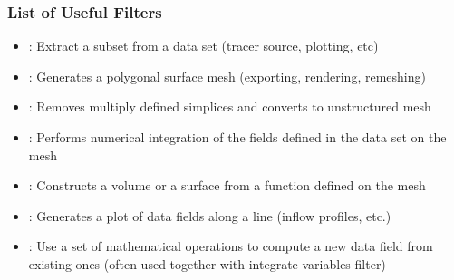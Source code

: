 \begin{frame}

  \frametitle{List of Useful Filters}

    \begin{itemize}
      \item {}: Extract a subset from a data set (tracer source, plotting, etc)
      \item {}: Generates a polygonal surface mesh (exporting, rendering, remeshing) 
      \item {}: Removes multiply defined simplices and converts to unstructured mesh
      \item {}: Performs numerical integration of the fields defined in the data set on the mesh 
      \item {}: Constructs a volume or a surface from a function defined on the mesh 
      \item {}: Generates a plot of data fields along a line (inflow profiles, etc.) 
      \item {}: Use a set of mathematical operations to compute a new data field from existing ones (often used together with integrate variables filter)
    \end{itemize}

\end{frame}

